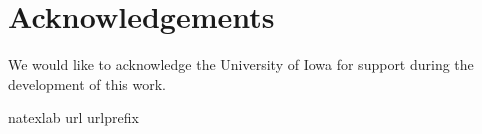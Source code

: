 \documentclass[12pt]{article} %
\theoremstyle{definition}
\begin{document}
\section*{Acknowledgements}

We would like to acknowledge the University of Iowa for support during the development of this work.
\par



\bibhang=1.7pc
\bibsep=2pt
\fontsize{9}{14pt plus.8pt minus .6pt}\selectfont
\renewcommand\bibname{\large \bf References}
\expandafter\ifx\csname
natexlab\endcsname\relax\def\natexlab#1{#1}\fi
\expandafter\ifx\csname url\endcsname\relax
  \def\url#1{\texttt{#1}}\fi
\expandafter\ifx\csname urlprefix\endcsname\relax\def\urlprefix{URL}\fi



\end{document}
